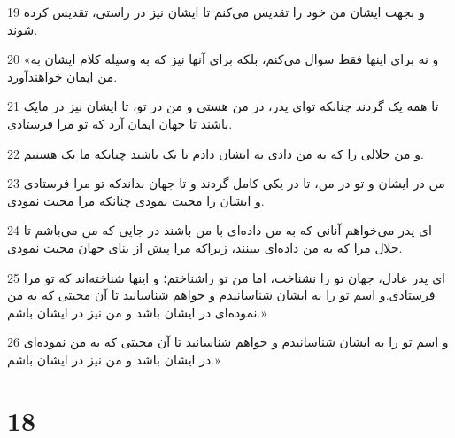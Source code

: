 \par 19 و بجهت ایشان من خود را تقدیس می‌کنم تا ایشان نیز در راستی، تقدیس کرده شوند.
\par 20 «و نه برای اینها فقط سوال می‌کنم، بلکه برای آنها نیز که به وسیله کلام ایشان به من ایمان خواهند‌آورد.
\par 21 تا همه یک گردند چنانکه تو‌ای پدر، در من هستی و من در تو، تا ایشان نیز در مایک باشند تا جهان ایمان آرد که تو مرا فرستادی.
\par 22 و من جلالی را که به من دادی به ایشان دادم تا یک باشند چنانکه ما یک هستیم.
\par 23 من در ایشان و تو در من، تا در یکی کامل گردند و تا جهان بداندکه تو مرا فرستادی و ایشان را محبت نمودی چنانکه مرا محبت نمودی.
\par 24 ‌ای پدر می‌خواهم آنانی که به من داده‌ای با من باشند در جایی که من می‌باشم تا جلال مرا که به من داده‌ای ببینند، زیراکه مرا پیش از بنای جهان محبت نمودی.
\par 25 ‌ای پدر عادل، جهان تو را نشناخت، اما من تو راشناختم؛ و اینها شناخته‌اند که تو مرا فرستادی.و اسم تو را به ایشان شناسانیدم و خواهم شناسانید تا آن محبتی که به من نموده‌ای در ایشان باشد و من نیز در ایشان باشم.»
\par 26 و اسم تو را به ایشان شناسانیدم و خواهم شناسانید تا آن محبتی که به من نموده‌ای در ایشان باشد و من نیز در ایشان باشم.»

\chapter{18}

